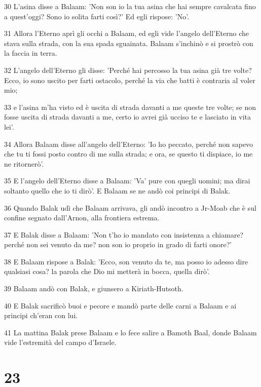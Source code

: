 \par 30 L'asina disse a Balaam: 'Non son io la tua asina che hai sempre cavalcata fino a quest'oggi? Sono io solita farti così?' Ed egli rispose: 'No'.
\par 31 Allora l'Eterno aprì gli occhi a Balaam, ed egli vide l'angelo dell'Eterno che stava sulla strada, con la sua spada sguainata. Balaam s'inchinò e si prostrò con la faccia in terra.
\par 32 L'angelo dell'Eterno gli disse: 'Perché hai percosso la tua asina già tre volte? Ecco, io sono uscito per farti ostacolo, perché la via che batti è contraria al voler mio;
\par 33 e l'asina m'ha visto ed è uscita di strada davanti a me queste tre volte; se non fosse uscita di strada davanti a me, certo io avrei già ucciso te e lasciato in vita lei'.
\par 34 Allora Balaam disse all'angelo dell'Eterno: 'Io ho peccato, perché non sapevo che tu ti fossi posto contro di me sulla strada; e ora, se questo ti dispiace, io me ne ritornerò'.
\par 35 E l'angelo dell'Eterno disse a Balaam: 'Va' pure con quegli uomini; ma dirai soltanto quello che io ti dirò'. E Balaam se ne andò coi principi di Balak.
\par 36 Quando Balak udì che Balaam arrivava, gli andò incontro a Jr-Moab che è sul confine segnato dall'Arnon, alla frontiera estrema.
\par 37 E Balak disse a Balaam: 'Non t'ho io mandato con insistenza a chiamare? perché non sei venuto da me? non son io proprio in grado di farti onore?'
\par 38 E Balaam rispose a Balak: 'Ecco, son venuto da te, ma posso io adesso dire qualsiasi cosa? la parola che Dio mi metterà in bocca, quella dirò'.
\par 39 Balaam andò con Balak, e giunsero a Kiriath-Hutsoth.
\par 40 E Balak sacrificò buoi e pecore e mandò parte delle carni a Balaam e ai principi ch'eran con lui.
\par 41 La mattina Balak prese Balaam e lo fece salire a Bamoth Baal, donde Balaam vide l'estremità del campo d'Israele.

\chapter{23}

